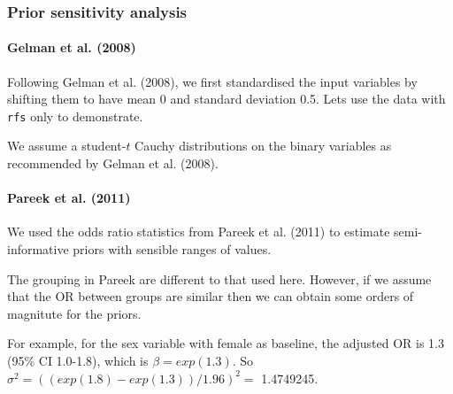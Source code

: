 \documentclass[]{article}
\newenvironment{Shaded}{\begin{snugshade}}{\end{snugshade}}
\newcommand{\CommentTok}[1]{\textcolor[rgb]{0.56,0.35,0.01}{\textit{#1}}}
\newcommand{\DecValTok}[1]{\textcolor[rgb]{0.00,0.00,0.81}{#1}}
\newcommand{\KeywordTok}[1]{\textcolor[rgb]{0.13,0.29,0.53}{\textbf{#1}}}
\newcommand{\NormalTok}[1]{#1}
\newcommand{\OperatorTok}[1]{\textcolor[rgb]{0.81,0.36,0.00}{\textbf{#1}}}
\newcommand{\StringTok}[1]{\textcolor[rgb]{0.31,0.60,0.02}{#1}}
\let\oldparagraph\paragraph
\renewcommand{\paragraph}[1]{\oldparagraph{#1}\mbox{}}
\begin{document}
\hypertarget{prior-sensitivity-analysis}{%
\subsubsection{Prior sensitivity
analysis}\label{prior-sensitivity-analysis}}

\hypertarget{gelman2008}{%
\paragraph{Gelman et al. (2008)}\label{gelman2008}}

Following Gelman et al. (2008), we first standardised the input
variables by shifting them to have mean 0 and standard deviation 0.5.
Lets use the data with \texttt{rfs} only to demonstrate.

\begin{Shaded}
\end{Shaded}

We assume a student-\(t\) Cauchy distributions on the binary variables
as recommended by Gelman et al. (2008).

\hypertarget{pareek2006}{%
\paragraph{Pareek et al. (2011)}\label{pareek2006}}

We used the odds ratio statistics from Pareek et al. (2011) to estimate
semi-informative priors with sensible ranges of values.

The grouping in Pareek are different to that used here. However, if we
assume that the OR between groups are similar then we can obtain some
orders of magnitute for the priors.

For example, for the sex variable with female as baseline, the adjusted
OR is 1.3 (95\% CI 1.0-1.8), which is \(\beta = exp(1.3)\). So
\(\sigma^2 = ((exp(1.8) - exp(1.3) )/1.96)^2 =\) 1.4749245.
\end{document}
